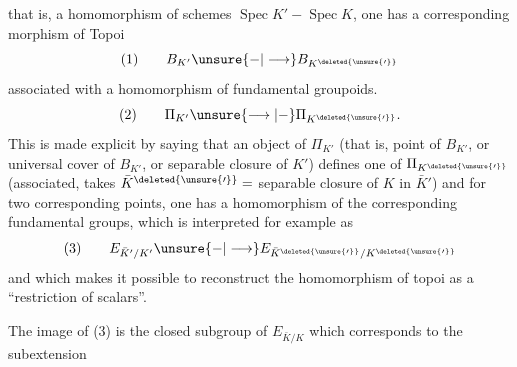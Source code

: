 that is, a homomorphism of schemes $\operatorname{Spec}K' - \operatorname{Spec}K$, one has a corresponding morphism of Topoi
\[
(1)\qquad B_{K'}\unsure{-|\longrightarrow}B_{K^{\deleted{\unsure{\prime}}}}
\]
associated with a homomorphism of fundamental groupoids.
\[
(2)\qquad \Pi_{K'}\unsure{\longrightarrow|-}\Pi_{K^{\deleted{\unsure{\prime}}}}.
\]
This is made explicit by saying that an  object of $\Pi_{K'}$ (that is, point of $B_{K'}$, or universal cover of $B_{K'}$, \deleted{)} or separable closure of $K'$) defines one of $\Pi_{K^{\deleted{\unsure{\prime}}}}$ (associated,  takes $\bar K^{\deleted{\unsure{\prime}}}=$ separable  closure of $K$ in $\bar K'$) and for two corresponding points, one has a homomorphism of the corresponding fundamental groups, which is interpreted for example as
\[
(3)\qquad E_{\bar K'/K'}\unsure{-|\longrightarrow}E_{\bar K^{\deleted{\unsure{\prime}}}/K^{\deleted{\unsure{\prime}}}}
\]
and which makes it possible to reconstruct the homomorphism of topoi as a ``restriction of scalars''.

The image of (3) is the closed subgroup of $E_{\bar K/K}$ which corresponds to the subextension
